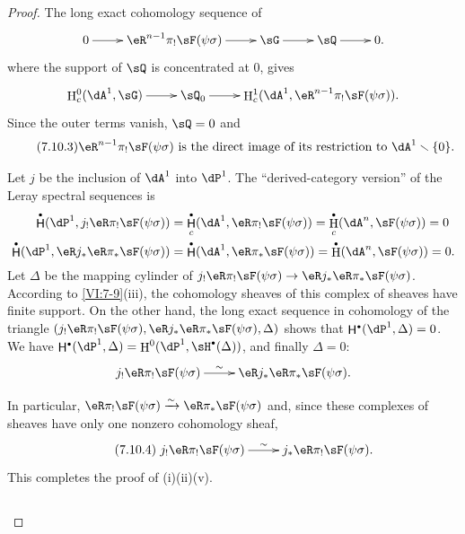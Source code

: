 \documentclass[oneside]{book}
\DeclareMathOperator{\h}{H}
\DeclareMathOperator{\hh}{\mathsf{H}} %
\newcommand{\iso}{\xrightarrow\sim}
\renewcommand{\setminus}{\smallsetminus}
\theoremstyle{sga-source}
\theoremstyle{sga-source-dash}
\theoremstyle{sga-source-dotdash}
\theoremstyle{sga-source-number-note-dash}
\theoremstyle{sga-source-note-number-dotdash}
\theoremstyle{sga-source-example-dotdash}
\theoremstyle{sga-source-inline-number}
\theoremstyle{sga-source-bare-number}
\theoremstyle{sga-source}
\let\oldbullet\bullet
\renewcommand{\bullet}{\textnormal{\tiny$\oldbullet$}}
\newcommand{\PrintPage}[1]{}\newcommand{\MathPage}[1]{}\newcommand{\PrintCite}[2]{#1}\newcommand{\var}[3]{#1}
\begin{document}
\begin{proof}[Proof]
\PrintPage{223}
The long exact cohomology sequence of 
\[\xymatrix{
  0 \ar[r] 
    & \eR^{n-1} \pi_! \sF(\psi\sigma) \ar[r] 
    & \sG \ar[r] 
    & \sQ \ar[r] 
    & 0 \text{.} 
}\]
where the support of $\sQ$ is concentrated at $0$, gives 
\[\xymatrix{
  \h_c^0(\dA^1,\sG) \ar[r] 
    & \sQ_0 \ar[r] 
    & \h_c^1(\dA^1,\eR^{n-1} \pi_! \sF(\psi\sigma)) \text{.} 
}\]
Since the outer terms vanish, $\sQ=0$ and 
\begin{equation*}\tag{7.10.3}\label{VI:eq:7-10-3}
  \text{$\eR^{n-1} \pi_! \sF(\psi\sigma)$ is the direct image of its restriction to $\dA^1\setminus \{0\}$.}
\end{equation*}

Let $j$ be the inclusion of $\dA^1$ into $\dP^1$. The ``derived-category 
version'' of the Leray spectral sequences is 
\begin{align*}
  \hh^\bullet(\dP^1,j_! \eR\pi_! \sF(\psi\sigma)) &= \hh_c^\bullet(\dA^1,\eR \pi_! \sF(\psi\sigma)) = \h_c^\bullet(\dA^n,\sF(\psi\sigma)) = 0 \\
  \hh^\bullet(\dP^1,\eR j_\ast \eR \pi_\ast \sF(\psi\sigma)) &= \hh^\bullet(\dA^1,\eR \pi_\ast \sF(\psi\sigma)) = \h^\bullet(\dA^n,\sF(\psi\sigma)) = 0 \text{.}
\end{align*}
Let $\Delta$ be the mapping cylinder of 
$j_! \eR\pi_! \sF(\psi\sigma) \to \eR j_\ast \eR \pi_\ast \sF(\psi\sigma)$. 
According to \ref{VI:7-9}(iii), the cohomology sheaves of this complex of 
sheaves have finite support. On the other hand, the long exact sequence in 
cohomology of the triangle 
$(j_!\eR \pi_! \sF(\psi\sigma),\eR j_\ast \eR \pi_\ast \sF(\psi\sigma),\Delta)$ 
shows that $\hh^\bullet(\dP^1,\Delta)=0$. We have 
$\hh^\bullet(\dP^1,\Delta) = \h^0(\dP^1,\sH^\bullet(\Delta))$, and finally 
$\Delta=0$: 
\[\xymatrix{
  j_! \eR\pi_! \sF(\psi\sigma) \ar[r]^-\sim 
    & \eR j_\ast \eR \pi_\ast \sF(\psi\sigma) \text{.} 
}\]

In particular, $\eR\pi_! \sF(\psi\sigma)\iso \eR\pi_\ast \sF(\psi\sigma)$ and, 
since these complexes of sheaves have only one nonzero cohomology sheaf, 
\begin{equation*}\tag{7.10.4}\label{VI:eq:7-10-4}
\xymatrix{
  j_! \eR \pi_! \sF(\psi\sigma) \ar[r]^-\sim 
    & j_\ast \eR \pi_! \sF(\psi\sigma) \text{.} 
}
\end{equation*}
This completes the proof of (i)(ii)(v). 





\PrintPage{224}
\subsection{}\label{VI:7-11}


\end{proof}
\end{document}
